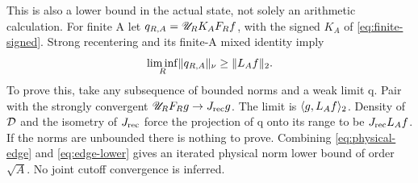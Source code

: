 This is also a lower bound in the actual state, not solely an
arithmetic calculation. For finite A let
$q_{R,A}=\mathscr U_RK_AF_Rf$, with the signed $K_A$ of
\eqref{eq:finite-signed}. Strong recentering and its finite-A
mixed identity imply
\begin{equation}\label{eq:physical-edge}
\liminf_R\lVert q_{R,A}\rVert_\nu\ge\lVert L_Af\rVert_2 .
\end{equation}
To prove this, take any subsequence of bounded norms and a
weak limit q. Pair with the strongly convergent
$\mathscr U_RF_Rg\to J_{\rm rec}g$. The limit is $\langle g,L_Af\rangle_2$.
Density of $\mathcal D$ and the isometry of $J_{\rm rec}$ force
the projection of q onto its range to be $J_{\rm rec}L_Af$.
If the norms are unbounded there is nothing to prove.
Combining \eqref{eq:physical-edge} and \eqref{eq:edge-lower}
gives an iterated physical norm lower bound of order $\sqrt A$.
No joint cutoff convergence is inferred.
